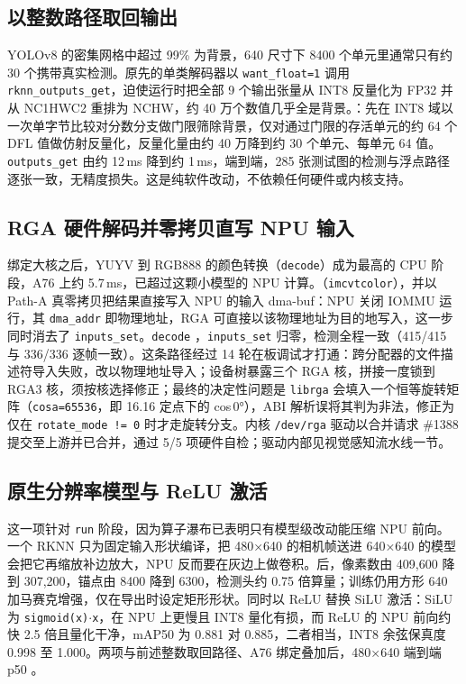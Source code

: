 \subsection{以整数路径取回输出}

YOLOv8 的密集网格中超过 99\% 为背景，640 尺寸下 8400 个单元里通常只有约 30 个携带真实检测。原先的单类解码器以 \texttt{want\_float=1} 调用 \texttt{rknn\_outputs\_get}，迫使运行时把全部 9 个输出张量从 INT8 反量化为 FP32 并从 NC1HWC2 重排为 NCHW，约 40 万个数值几乎全是背景。：先在 INT8 域以一次单字节比较对分数分支做门限筛除背景，仅对通过门限的存活单元的约 64 个 DFL 值做仿射反量化，反量化量由约 40 万降到约 30 个单元、每单元 64 值。\texttt{outputs\_get} 由约 12\,ms 降到约 1\,ms，端到端，285 张测试图的检测与浮点路径逐张一致，无精度损失。这是纯软件改动，不依赖任何硬件或内核支持。

\subsection{RGA 硬件解码并零拷贝直写 NPU 输入}

绑定大核之后，YUYV 到 RGB888 的颜色转换（\texttt{decode}）成为最高的 CPU 阶段，A76 上约 5.7\,ms，已超过这颗小模型的 NPU 计算。（\texttt{imcvtcolor}），并以 Path-A 真零拷贝把结果直接写入 NPU 的输入 dma-buf：NPU 关闭 IOMMU 运行，其 \texttt{dma\_addr} 即物理地址，RGA 可直接以该物理地址为目的地写入，这一步同时消去了 \texttt{inputs\_set}。\texttt{decode} ，\texttt{inputs\_set} 归零，检测全程一致（415/415 与 336/336 逐帧一致）。这条路径经过 14 轮在板调试才打通：跨分配器的文件描述符导入失败，改以物理地址导入；设备树暴露三个 RGA 核，拼接一度锁到 RGA3 核，须按核选择修正；最终的决定性问题是 \texttt{librga} 会填入一个恒等旋转矩阵（\texttt{cosa=65536}，即 16.16 定点下的 cos\,0°），ABI 解析误将其判为非法，修正为仅在 \texttt{rotate\_mode != 0} 时才走旋转分支。内核 \texttt{/dev/rga} 驱动以合并请求 \#1388 提交至上游并已合并，通过 5/5 项硬件自检；驱动内部见视觉感知流水线一节。

\subsection{原生分辨率模型与 ReLU 激活}

这一项针对 \texttt{run} 阶段，因为算子瀑布已表明只有模型级改动能压缩 NPU 前向。一个 RKNN 只为固定输入形状编译，把 480×640 的相机帧送进 640×640 的模型会把它再缩放补边放大，NPU 反而要在灰边上做卷积。后，像素数由 409{,}600 降到 307{,}200，锚点由 8400 降到 6300，检测头约 0.75 倍算量；训练仍用方形 640 加马赛克增强，仅在导出时设定矩形形状。同时以 ReLU 替换 SiLU 激活：SiLU 为 \texttt{sigmoid(x)}$\cdot$\texttt{x}，在 NPU 上更慢且 INT8 量化有损，而 ReLU 的 NPU 前向约快 2.5 倍且量化干净，mAP50 为 0.881 对 0.885，二者相当，INT8 余弦保真度 0.998 至 1.000。两项与前述整数取回路径、A76 绑定叠加后，480×640 端到端 p50 。

